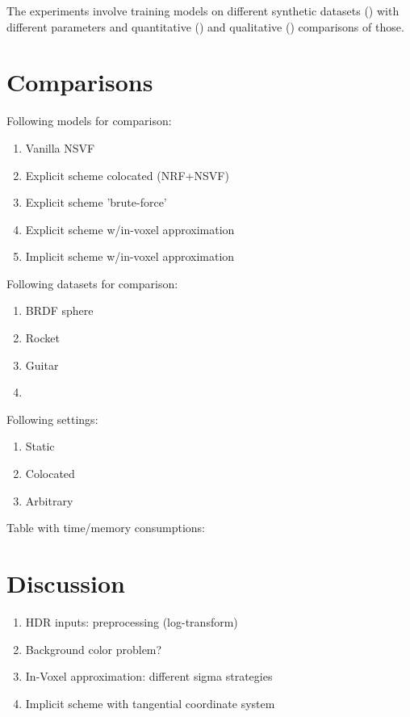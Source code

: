 The experiments involve training models on different synthetic datasets () with different parameters
and quantitative () and qualitative () comparisons of those.



\section{Comparisons}

Following models for comparison:
\begin{enumerate}
    \item Vanilla NSVF
    \item Explicit scheme colocated (NRF+NSVF)
    \item Explicit scheme 'brute-force'
    \item Explicit scheme w/in-voxel approximation
    \item Implicit scheme w/in-voxel approximation
\end{enumerate}


Following datasets for comparison:
\begin{enumerate}
    \item BRDF sphere
    \item Rocket
    \item Guitar
    \item \color{red}{Trophy/donut/tablelamp}
\end{enumerate}

Following settings:
\begin{enumerate}
    \item Static
    \item Colocated
    \item Arbitrary
\end{enumerate}


Table with time/memory consumptions:



\section{Discussion}

\begin{enumerate}
    \item HDR inputs: preprocessing (log-transform)
    \item Background color problem?
    \item In-Voxel approximation: different sigma strategies
    \item Implicit scheme with tangential coordinate system
\end{enumerate}


